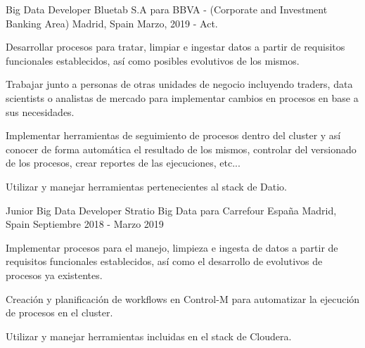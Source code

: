 

\begin{cventries}

  \cventry
    {Big Data Developer} %
    {Bluetab S.A para BBVA - (Corporate and Investment Banking Area)} %
    {Madrid, Spain} %
    {Marzo, 2019 - Act.} %
    {
      \begin{cvitems} %
        \item {Desarrollar procesos para tratar, limpiar e ingestar datos a partir de requisitos funcionales establecidos, así como posibles evolutivos de los mismos.}
        \item {Trabajar junto a personas de otras unidades de negocio incluyendo traders, data scientists o analistas de mercado para implementar cambios en procesos en base a sus necesidades.}
        \item {Implementar herramientas de seguimiento de procesos dentro del cluster y así conocer de forma automática el resultado de los mismos, controlar del versionado de los procesos, crear reportes de las ejecuciones, etc...}
        \item {Utilizar y manejar herramientas pertenecientes al stack de Datio.}
      \end{cvitems}
    }

  \cventry
    {Junior Big Data Developer} %
    {Stratio Big Data para Carrefour España} %
    {Madrid, Spain} %
    {Septiembre 2018 - Marzo 2019} %
    {
      \begin{cvitems} %
        \item {Implementar procesos para el manejo, limpieza e ingesta de datos a partir de requisitos funcionales establecidos, así como el desarrollo de evolutivos de procesos ya existentes.}
        \item {Creación y planificación de workflows en Control-M para automatizar la ejecución de procesos en el cluster.}
        \item {Utilizar y manejar herramientas incluidas en el stack de Cloudera.}
      \end{cvitems}
    }


\end{cventries}
